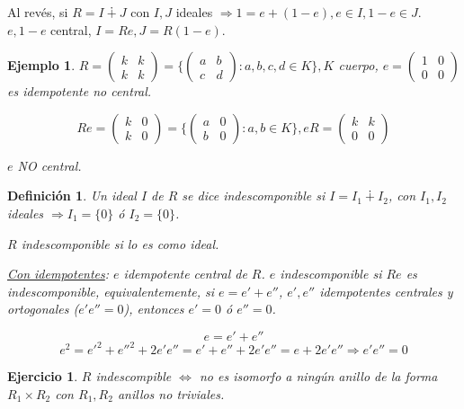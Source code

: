 \documentclass[11pt,a4paper]{article}
\theoremstyle{break}
\newtheorem{example}[theorem]{Ejemplo}
\newtheorem{definition}[theorem]{Definición}
\newtheorem{task}[theorem]{Ejercicio}
\begin{document}
Al revés, si $R = I \dotplus J$ con $I, J$ ideales $\Rightarrow 1 = e + (1-e), e \in I, 1-e \in J$. \\
$e, 1-e$ central, $I = Re, J = R(1-e)$.

\begin{example}
$R = \begin{pmatrix}
k & k \\
k & k
\end{pmatrix} = \{\begin{pmatrix}
a & b \\
c & d
\end{pmatrix}: a, b, c, d \in K\}, K$ cuerpo, $e = \begin{pmatrix}
1 & 0 \\
0 & 0
\end{pmatrix}$ es idempotente no central.

$$Re = \begin{pmatrix}
k & 0 \\
k & 0
\end{pmatrix} = \{\begin{pmatrix}
a & 0 \\
b & 0
\end{pmatrix}: a, b \in K\}, eR = \begin{pmatrix}
k & k \\
0 & 0
\end{pmatrix}$$

$e$ NO central.
\end{example}

\begin{definition}
Un ideal $I$ de $R$ se dice indescomponible si $I = I_{1} \dotplus I_{2}$, con $I_{1}, I_{2}$ ideales $\Rightarrow I_{1} = \{0\}$ ó $I_{2} = \{0\}$.

$R$ indescomponible si lo es como ideal.

\underline{Con idempotentes}: $e$ idempotente central de $R$. $e$ indescomponible si $Re$ es indescomponible, equivalentemente, si $e = e' + e''$, $e', e''$ idempotentes centrales y ortogonales ($e' e'' = 0$), entonces $e' = 0$ ó $e'' = 0$.

$$e = e' + e''$$
$$e^{2} = e'^{2} + e''^{2} + 2e'e'' = e' + e'' + 2e'e'' = e + 2e'e'' \Rightarrow e'e'' = 0$$
\end{definition}

\begin{task}
$R$ indescompible $\iff$ no es isomorfo a ningún anillo de la forma $R_{1} \times R_{2}$ con $R_{1}, R_{2}$ anillos no triviales.
\end{task}
\end{document}
